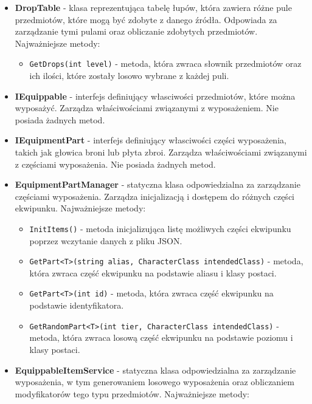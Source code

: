 \begin{itemize}
\begin{itemize}
                \end{itemize}
            \item \textbf{DropTable} - klasa reprezentująca tabelę łupów, która zawiera różne pule przedmiotów, które mogą być zdobyte z danego źródła. 
            Odpowiada za zarządzanie tymi pulami oraz obliczanie zdobytych przedmiotów. Najważniejsze metody:
                \begin{itemize}
                    \item \texttt{GetDrops(int level)} - metoda, która zwraca słownik przedmiotów oraz ich ilości, które zostały losowo wybrane z każdej puli.
                \end{itemize}
            \item \textbf{IEquippable} - interfejs definiujący własciwości przedmiotów, które można wyposażyć. 
            Zarządza właściwościami związanymi z wyposażeniem. Nie posiada żadnych metod.
            \item \textbf{IEquipmentPart} - interfejs definiujący własciwości części wyposażenia, takich jak głowica broni lub płyta zbroi. 
            Zarządza właściwościami związanymi z częściami wyposażenia. Nie posiada żadnych metod.
            \item \textbf{EquipmentPartManager} - statyczna klasa odpowiedzialna za zarządzanie częściami wyposażenia. 
            Zarządza inicjalizacją i dostępem do różnych części ekwipunku. Najważniejsze metody:
                \begin{itemize}
                    \item \texttt{InitItems()} - metoda inicjalizująca listę możliwych części ekwipunku poprzez wczytanie danych z pliku JSON.
                    \item \texttt{GetPart<T>(string alias, CharacterClass intendedClass)} - metoda, która zwraca część ekwipunku na podstawie aliasu i klasy postaci.
                    \item \texttt{GetPart<T>(int id)} - metoda, która zwraca część ekwipunku na podstawie identyfikatora.
                    \item \texttt{GetRandomPart<T>(int tier, CharacterClass intendedClass)} - metoda, która zwraca losową część ekwipunku na podstawie poziomu i klasy postaci.
                \end{itemize}
            \item \textbf{EquippableItemService} - statyczna klasa odpowiedzialna za zarządzanie wyposażenia, 
            w tym generowaniem losowego wyposażenia oraz obliczaniem modyfikatorów tego typu przedmiotów. Najważniejsze metody:

\end{itemize}

